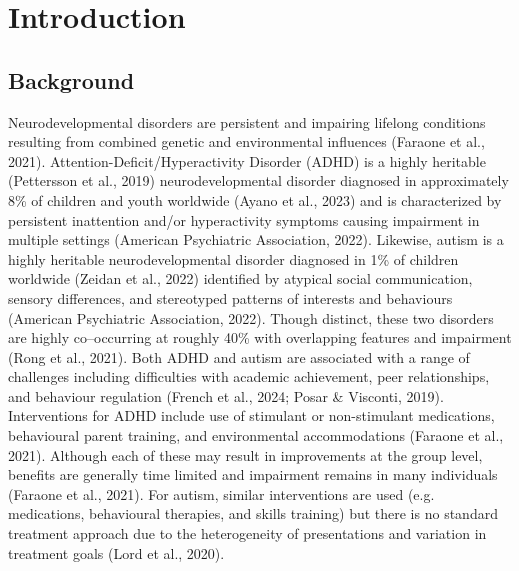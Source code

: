 \documentclass[
  letterpaper,
]{ut-thesis}
\begin{document}

\chapter{Introduction}\label{introduction}


\section{Background}\label{background}

Neurodevelopmental disorders are persistent and impairing lifelong
conditions resulting from combined genetic and environmental influences
(Faraone et al., 2021). Attention-Deficit/Hyperactivity Disorder (ADHD)
is a highly heritable (Pettersson et al., 2019) neurodevelopmental
disorder diagnosed in approximately 8\% of children and youth worldwide
(Ayano et al., 2023) and is characterized by persistent inattention
and/or hyperactivity symptoms causing impairment in multiple settings
(American Psychiatric Association, 2022). Likewise, autism is a highly
heritable neurodevelopmental disorder diagnosed in 1\% of children
worldwide (Zeidan et al., 2022) identified by atypical social
communication, sensory differences, and stereotyped patterns of
interests and behaviours (American Psychiatric Association, 2022).
Though distinct, these two disorders are highly co--occurring at roughly
40\% with overlapping features and impairment (Rong et al., 2021). Both
ADHD and autism are associated with a range of challenges including
difficulties with academic achievement, peer relationships, and
behaviour regulation (French et al., 2024; Posar \& Visconti, 2019).
Interventions for ADHD include use of stimulant or non-stimulant
medications, behavioural parent training, and environmental
accommodations (Faraone et al., 2021). Although each of these may result
in improvements at the group level, benefits are generally time limited
and impairment remains in many individuals (Faraone et al., 2021). For
autism, similar interventions are used (e.g.\,medications, behavioural
therapies, and skills training) but there is no standard treatment
approach due to the heterogeneity of presentations and variation in
treatment goals (Lord et al., 2020).
\end{document}
